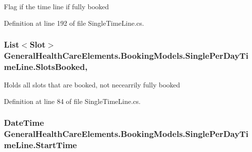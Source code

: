 Flag if the time line if fully booked 



Definition at line 192 of file Single\+Time\+Line.\+cs.

\subsubsection[{\texorpdfstring{Slots\+Booked}{SlotsBooked}}]{\setlength{\rightskip}{0pt plus 5cm}List$<${\bf Slot}$>$ General\+Health\+Care\+Elements.\+Booking\+Models.\+Single\+Per\+Day\+Time\+Line.\+Slots\+Booked\hspace{0.3cm}{\ttfamily [get]}, {\ttfamily [set]}}\hypertarget{class_general_health_care_elements_1_1_booking_models_1_1_single_per_day_time_line_a9824efe9d8f77e6c606e7d4a7e76e996}{}\label{class_general_health_care_elements_1_1_booking_models_1_1_single_per_day_time_line_a9824efe9d8f77e6c606e7d4a7e76e996}


Holds all slots that are booked, not necearrily fully booked 



Definition at line 84 of file Single\+Time\+Line.\+cs.

\subsubsection[{\texorpdfstring{Start\+Time}{StartTime}}]{\setlength{\rightskip}{0pt plus 5cm}Date\+Time General\+Health\+Care\+Elements.\+Booking\+Models.\+Single\+Per\+Day\+Time\+Line.\+Start\+Time\hspace{0.3cm}{\ttfamily [get]}}\hypertarget{class_general_health_care_elements_1_1_booking_models_1_1_single_per_day_time_line_a93de5cc16f299e9103ac0aa6f0cf33f5}{}\label{class_general_health_care_elements_1_1_booking_models_1_1_single_per_day_time_line_a93de5cc16f299e9103ac0aa6f0cf33f5}


